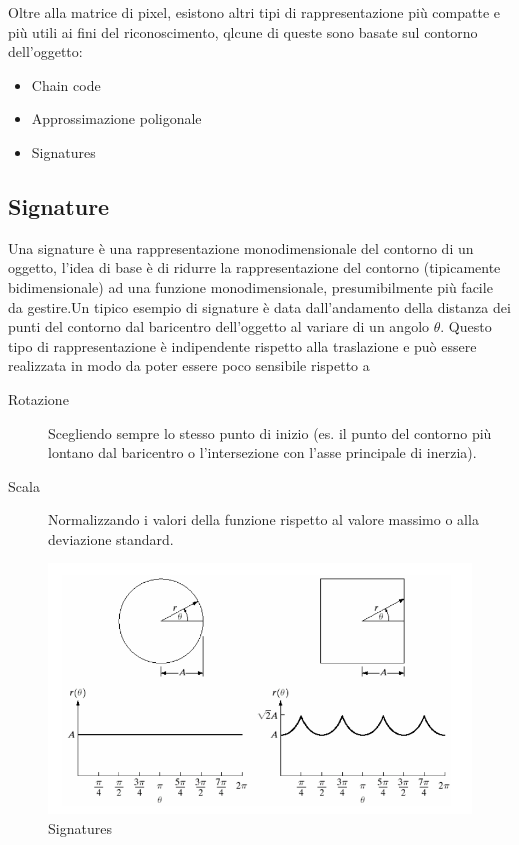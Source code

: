 Oltre alla matrice di pixel, esistono altri tipi di 
rappresentazione più compatte e più utili ai 
fini del riconoscimento, qlcune di queste sono basate sul contorno 
dell’oggetto:
\begin{itemize}
\item Chain code
\item Approssimazione poligonale
\item Signatures
\end{itemize}

\subsection{Signature} Una signature è una rappresentazione  monodimensionale
del contorno di un oggetto, l’idea di base è di ridurre la  rappresentazione
del contorno (tipicamente  bidimensionale) ad una funzione  monodimensionale,
presumibilmente più  facile da gestire.Un tipico esempio di signature è data
dall’andamento della distanza dei punti del contorno  dal baricentro
dell’oggetto al variare di un angolo $\theta$. Questo tipo di rappresentazione
è indipendente rispetto alla traslazione e può  essere realizzata in modo da
poter essere  poco sensibile rispetto a

\begin{description}
\item[Rotazione]Scegliendo sempre lo stesso punto di inizio (es. il 
punto del contorno più lontano dal baricentro o 
l’intersezione con l’asse principale di inerzia).
\item[Scala]Normalizzando i valori della funzione rispetto al valore 
massimo o alla deviazione standard.
\end{description}

\begin{figure}[h]
\centering
\includegraphics[width=.8\textwidth]{img/signatures.png}
\caption{Signatures}
\label{fig:signatures}
\end{figure}

